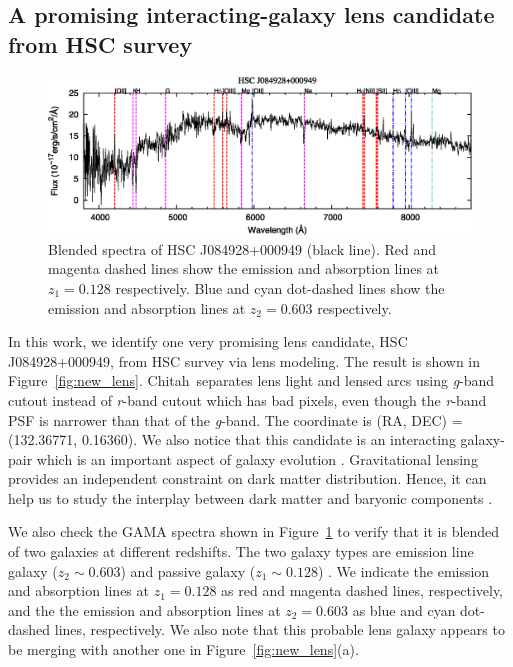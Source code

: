 \documentclass[apj]{emulateapj}
\def\chitah{{\sc Chitah}}
\newcommand{\fref}[1]{Figure~\ref{#1}}
\def\eg{{e.g.,}}
\begin{document}
\subsection{A promising interacting-galaxy lens candidate from HSC survey}
\label{subsec:newlens}

\begin{figure}
\centering
\includegraphics[angle=0,scale=0.7]{figure/spectrum.eps}
\caption{
Blended spectra of HSC J084928+000949 (black line). Red and magenta dashed lines show the emission and absorption lines at $z_1 = 0.128$ respectively. 
Blue and cyan dot-dashed lines show the emission and absorption lines at $z_2 = 0.603$ respectively.}
\label{fig:spec}
\end{figure}

In this work, we identify one very promising lens candidate, HSC J084928+000949, from HSC survey via lens modeling.
The result is shown in \fref{fig:new_lens}.
\chitah\ separates lens light and lensed arcs using {\it g}-band cutout instead of {\it r}-band cutout which has bad pixels,
even though the {\it r}-band PSF is narrower than that of the {\it g}-band.
The coordinate is (RA, DEC) = (132.36771, 0.16360). 
We also notice that this candidate is an interacting galaxy-pair which is an important aspect of galaxy evolution \citep[\eg][]{HopkinsEtal06,LotzEtal08}.
Gravitational lensing provides an independent constraint on dark matter distribution. 
Hence, it can help us to study the interplay between dark matter and baryonic components \citep[\eg][]{BarnabeEtal11,SonnenfeldEtal15}. 

We also check the GAMA spectra shown in \fref{fig:spec} \citep{LiskeEtal15} to verify that it is blended of two galaxies at different redshifts.
The two galaxy types are emission line galaxy ($z_2\sim0.603$) and passive galaxy ($z_1\sim0.128$) \citep{HolwerdaEtal15}. 
We indicate the emission and absorption lines at $z_1 = 0.128$ as red and magenta dashed lines, respectively, 
and the the emission and absorption lines at $z_2 = 0.603$ as blue and cyan dot-dashed lines, respectively.  
We also note that this probable lens galaxy appears to be merging with another one in \fref{fig:new_lens}(a).
\end{document}
